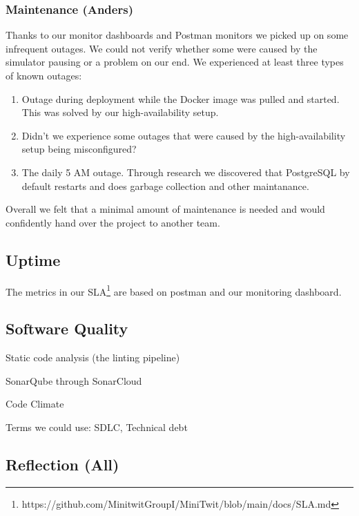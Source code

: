 \documentclass{article}
\begin{document}
{\subsubsection{Maintenance (Anders)}

Thanks to our monitor dashboards and Postman monitors we picked up on some infrequent outages. We could not verify whether some were caused by the simulator pausing or a problem on our end. We experienced at least three types of known outages:

\begin{enumerate}
    \item Outage during deployment while the Docker image was pulled and started. This was solved by our high-availability setup. 
    \item Didn't we experience some outages that were caused by the high-availability setup being misconfigured?
    \item The daily 5 AM outage. Through research we discovered that PostgreSQL by default restarts and does garbage collection and other maintanance. 
\end{enumerate}

Overall we felt that a minimal amount of maintenance is needed and would confidently hand over the project to another team. 

\subsection{Uptime}

The metrics in our SLA\footnote{https://github.com/MinitwitGroupI/MiniTwit/blob/main/docs/SLA.md} are based on postman and our monitoring dashboard. 





\subsection{Software Quality}



Static code analysis (the linting pipeline)

SonarQube through SonarCloud 

Code Climate

Terms we could use: SDLC, Technical debt


\subsection{Reflection (All)}

}
\end{document}
